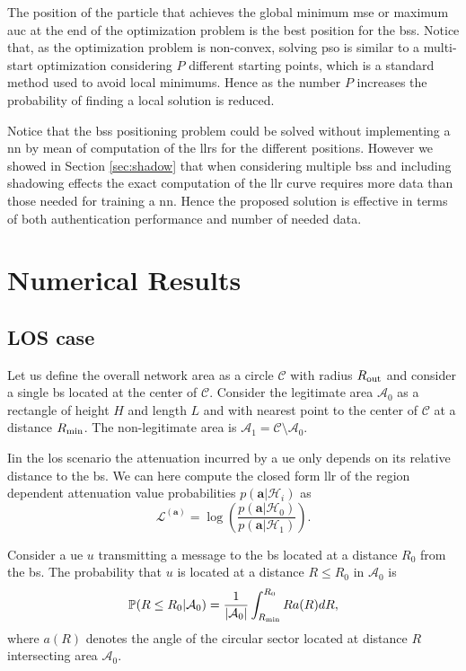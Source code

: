 \documentclass[twocolumns]{IEEEtran}
\begin{document}
The position of the particle that achieves the global minimum \ac{mse} or maximum \ac{auc} at the end of the optimization problem is the best position for the \acp{bs}. Notice that, as the optimization problem is non-convex, solving \ac{pso} is similar to a multi-start  optimization considering $P$ different starting points, which is a standard method used to avoid local minimums. Hence as the number $P$ increases the probability of finding a local solution is reduced.

Notice that the \acp{bs} positioning problem could be solved without implementing a \ac{nn} by mean of computation of the \acp{llr} for the different positions. However we showed in Section \ref{sec:shadow} that when considering multiple \acp{bs} and including shadowing effects the exact computation of the \ac{llr} curve requires more data than those needed for training a \ac{nn}. Hence the proposed solution is effective in terms of both authentication performance and number of needed data.

\section{Numerical Results}
\subsection{LOS case}

Let us define the overall network area as a circle $\mathcal{C}$ with radius $R_{\rm out}$ and consider a single \ac{bs} located at the center of $\mathcal{C}$. Consider the legitimate area $\mathcal{A}_{0}$ as a rectangle of height $H$ and length $L$ and with nearest point to the center of $\mathcal{C}$ at a distance $R_{\rm min}$. The non-legitimate area is $\mathcal{A}_1 = \mathcal{C} \setminus \mathcal{A}_0$.

Iin the \ac{los} scenario the attenuation incurred by a \ac{ue} only depends on its relative distance to the \ac{bs}. We can here compute the closed form \ac{llr} of the region dependent attenuation value probabilities $p(\bm{a}|\mathcal{H}_i)$ as
\begin{equation}\label{eq:lr}
    \mathcal{L}^{(\bm{a})}=\log\left(\frac{p(\bm{a}|\mathcal{H}_0)}{p(\bm{a}|\mathcal{H}_1)}\right).
\end{equation}

Consider a \ac{ue} $u$ transmitting a message to the \ac{bs} located at a distance $R_0$ from the \ac{bs}. The probability that $u$ is located at a distance $R\le R_0$ in $\mathcal{A}_0$ is
\begin{equation}\label{eq:cdf}
     \mathbb{P}(R \le R_0|\mathcal{A}_0) = \frac{1}{|\mathcal{A}_0|}\int_{R_{\rm min}}^{R_0} R a(R) dR,
\end{equation}
where $a(R)$ denotes the angle of the circular sector located at distance $R$ intersecting area $\mathcal{A}_0$.
\end{document}
